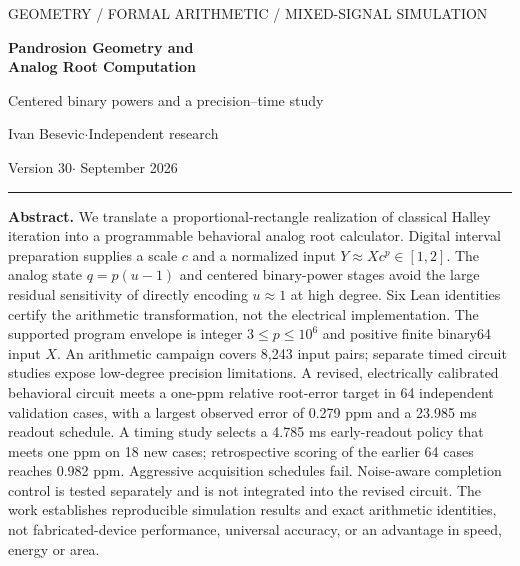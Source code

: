 \documentclass[11pt,a4paper]{article}
\begin{document}
\thispagestyle{empty}
{\small\sffamily\color{teal} GEOMETRY / FORMAL ARITHMETIC / MIXED-SIGNAL SIMULATION}\par
\vspace{8pt}
{\fontsize{24}{27}\selectfont\bfseries\color{ink} Pandrosion Geometry and\\Analog Root Computation\par}
\vspace{6pt}
{\large Centered binary powers and a precision--time study}\par
\vspace{9pt}
Ivan Besevic\quad$\cdot$\quad Independent research\par
{\small Version 30\quad$\cdot$ September 2026}
\vspace{8pt}\hrule\vspace{8pt}
\textbf{Abstract.}
We translate a proportional-rectangle realization of classical Halley iteration into a programmable behavioral analog root calculator. Digital interval preparation supplies a scale $c$ and a normalized input $Y\approx Xc^p\in[1,2]$. The analog state $q=p(u-1)$ and centered binary-power stages avoid the large residual sensitivity of directly encoding $u\approx1$ at high degree. Six Lean identities certify the arithmetic transformation, not the electrical implementation. The supported program envelope is integer $3\le p\le10^6$ and positive finite binary64 input $X$. An arithmetic campaign covers 8,243 input pairs; separate timed circuit studies expose low-degree precision limitations. A revised, electrically calibrated behavioral circuit meets a one-ppm relative root-error target in 64 independent validation cases, with a largest observed error of 0.279 ppm and a 23.985 ms readout schedule. A timing study selects a 4.785 ms early-readout policy that meets one ppm on 18 new cases; retrospective scoring of the earlier 64 cases reaches 0.982 ppm. Aggressive acquisition schedules fail. Noise-aware completion control is tested separately and is not integrated into the revised circuit. The work establishes reproducible simulation results and exact arithmetic identities, not fabricated-device performance, universal accuracy, or an advantage in speed, energy or area.
\end{document}
